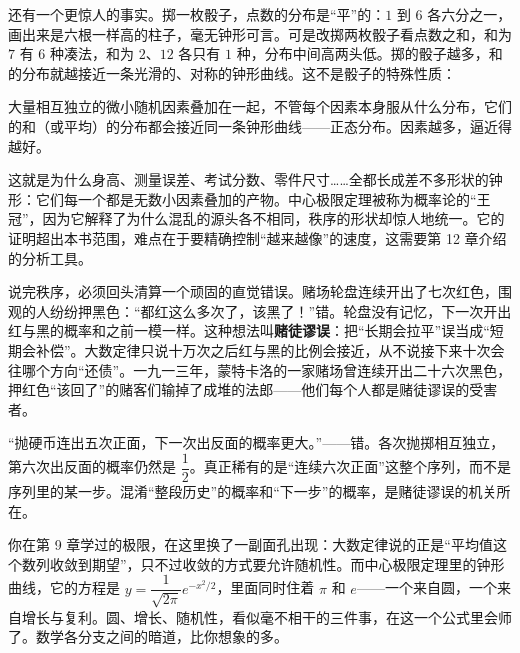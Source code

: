 还有一个更惊人的事实。掷一枚骰子，点数的分布是“平”的：$1$ 到 $6$ 各六分之一，画出来是六根一样高的柱子，毫无钟形可言。可是改掷两枚骰子看点数之和，和为 $7$ 有 $6$ 种凑法，和为 $2$、$12$ 各只有 $1$ 种，分布中间高两头低。掷的骰子越多，和的分布就越接近一条光滑的、对称的钟形曲线。这不是骰子的特殊性质：

\begin{dingli}
大量相互独立的微小随机因素叠加在一起，不管每个因素本身服从什么分布，它们的和（或平均）的分布都会接近同一条钟形曲线——正态分布。因素越多，逼近得越好。
\end{dingli}

\begin{center}
\end{center}

这就是为什么身高、测量误差、考试分数、零件尺寸……全都长成差不多形状的钟形：它们每一个都是无数小因素叠加的产物。中心极限定理被称为概率论的“王冠”，因为它解释了为什么混乱的源头各不相同，秩序的形状却惊人地统一。它的证明超出本书范围，难点在于要精确控制“越来越像”的速度，这需要第 12 章介绍的分析工具。

说完秩序，必须回头清算一个顽固的直觉错误。赌场轮盘连续开出了七次红色，围观的人纷纷押黑色：“都红这么多次了，该黑了！”错。轮盘没有记忆，下一次开出红与黑的概率和之前一模一样。这种想法叫\textbf{赌徒谬误}：把“长期会拉平”误当成“短期会补偿”。大数定律只说十万次之后红与黑的比例会接近，从不说接下来十次会往哪个方向“还债”。一九一三年，蒙特卡洛的一家赌场曾连续开出二十六次黑色，押红色“该回了”的赌客们输掉了成堆的法郎——他们每个人都是赌徒谬误的受害者。

\begin{fanli}
“抛硬币连出五次正面，下一次出反面的概率更大。”——错。各次抛掷相互独立，第六次出反面的概率仍然是 $\dfrac{1}{2}$。真正稀有的是“连续六次正面”这整个序列，而不是序列里的某一步。混淆“整段历史”的概率和“下一步”的概率，是赌徒谬误的机关所在。
\end{fanli}

\begin{lianjie}
你在第 9 章学过的极限，在这里换了一副面孔出现：大数定律说的正是“平均值这个数列收敛到期望”，只不过收敛的方式要允许随机性。而中心极限定理里的钟形曲线，它的方程是 $y=\dfrac{1}{\sqrt{2\pi}}e^{-x^2/2}$，里面同时住着 $\pi$ 和 $e$——一个来自圆，一个来自增长与复利。圆、增长、随机性，看似毫不相干的三件事，在这一个公式里会师了。数学各分支之间的暗道，比你想象的多。
\end{lianjie}

